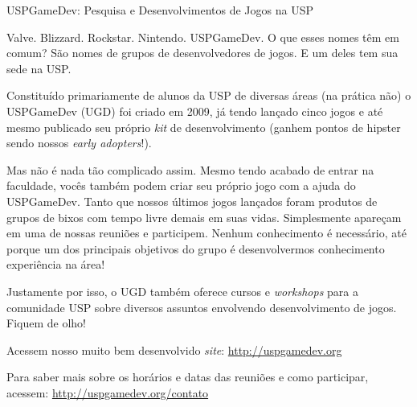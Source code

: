 \begin{subsecao}{USPGameDev: Pesquisa e Desenvolvimentos de Jogos na USP}


Valve. Blizzard. Rockstar. Nintendo. USPGameDev. O que esses nomes têm em comum?
São nomes de grupos de desenvolvedores de jogos. E um deles tem sua sede na USP.

Constituído primariamente de alunos da USP de diversas áreas (na prática não) o 
USPGameDev (UGD) foi criado em 2009, já tendo lançado cinco jogos e 
até mesmo publicado seu próprio \textit{kit} de desenvolvimento (ganhem pontos
de hipster sendo nossos \textit{early adopters}!).

Mas não é nada tão complicado assim. Mesmo tendo acabado de entrar na faculdade,
vocês também podem criar seu próprio jogo com a ajuda do USPGameDev. Tanto que
nossos últimos jogos lançados foram produtos de grupos de bixos com tempo livre
demais em suas vidas. Simplesmente apareçam em uma de nossas reuniões e
participem. Nenhum conhecimento é necessário, até porque um dos principais
objetivos do grupo é desenvolvermos conhecimento experiência na área!

Justamente por isso, o UGD também oferece cursos e \textit{workshops} para a
comunidade USP sobre diversos assuntos envolvendo desenvolvimento de jogos.
Fiquem de olho!

Acessem nosso muito bem desenvolvido \textit{site}: 
\url{http://uspgamedev.org}

Para saber mais sobre os horários e datas das reuniões e como participar,
acessem:
\url{http://uspgamedev.org/contato}

\end{subsecao}

